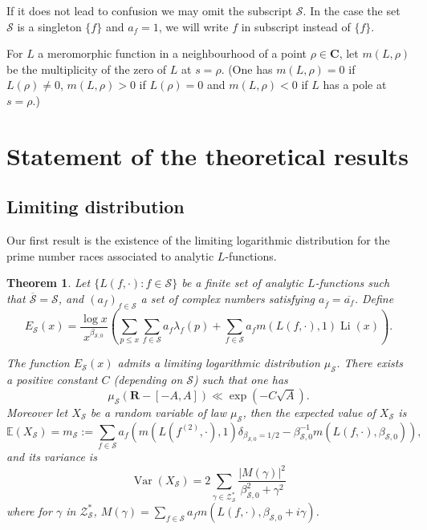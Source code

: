 \documentclass[a4paper,10pt]{amsart}
\theoremstyle{plain}
\newtheorem{theo}{Theorem}[section]
\theoremstyle{definition}
\begin{document}
If it does not lead to confusion we may omit the subscript $\mathcal{S}$. 
In the case the set $\mathcal{S}$ is a singleton $\lbrace f \rbrace$ and $a_{f}=1$, we will write $f$ in subscript instead of $\lbrace f\rbrace$.

For $L$ a meromorphic function in a neighbourhood of a point $\rho\in\mathbf{C}$,
let $m(L,\rho)$ be the multiplicity of the zero of $L$ at $s=\rho$.
(One has $m(L,\rho)=0$ if $L(\rho)\neq 0$, $m(L,\rho)>0$ if $L(\rho)= 0$ and $m(L,\rho)<0$ if $L$ has a pole at $s=\rho$.)

\section{Statement of the theoretical results}
\subsection{Limiting distribution}

Our first result is the existence of the limiting logarithmic distribution for the prime number races associated to analytic $L$-functions.
\begin{theo}\label{Th_DistLim}
Let $\lbrace L(f,\cdot) : f\in\mathcal{S} \rbrace$ be a finite set of analytic $L$-functions such that $\overline{\mathcal{S}}=\mathcal{S}$, 
and $(a_{f})_{f\in \mathcal{S}}$ a set of complex numbers satisfying $a_{\overline{f}}= \overline{a_{f}}$.
Define
$$E_{\mathcal{S}}(x)=\frac{\log x}{x^{\beta_{\mathcal{S},0}}}\left(
\sum_{p\leq x}\sum_{f\in\mathcal{S}}a_{f}\lambda_{f}(p) + \sum_{f\in\mathcal{S}}a_{f}m(L(f,\cdot),1) \operatorname{Li}(x) \right).$$

The function $E_{\mathcal{S}}(x)$ admits a limiting logarithmic distribution $\mu_{\mathcal{S}}$.
There exists a positive constant $C$ (depending on $\mathcal{S}$) such that one has 
$$\mu_{\mathcal{S}}(\mathbf{R}-[-A,A]) \ll \exp(-C\sqrt{A}).$$
Moreover let $X_{\mathcal{S}}$ be a random variable of law $\mu_{\mathcal{S}}$,
then the expected value of $X_{\mathcal{S}}$ is
	$$\mathbb{E}(X_{\mathcal{S}}) = m_{\mathcal{S}} := \sum_{f\in\mathcal{S}}a_{f}
	\left(m(L(f^{(2)},\cdot),1)\delta_{\beta_{\mathcal{S},0}=1/2} 
	-\beta_{\mathcal{S},0}^{-1}m(L(f,\cdot),\beta_{\mathcal{S},0})\right),$$ 
and its variance is
	$$\operatorname{Var}(X_{\mathcal{S}}) = 2\sum_{\gamma \in \mathcal{Z}_{\mathcal{S}}^{*}}\frac{\lvert M(\gamma)\rvert^{2}}{\beta_{\mathcal{S},0}^{2}+\gamma^{2}}$$
	where for $\gamma$ in $\mathcal{Z}_{\mathcal{S}}^{*}$, 
	$M(\gamma) = \sum_{f\in\mathcal{S}}a_{f}m(L(f,\cdot),\beta_{\mathcal{S},0}+i\gamma)$.
\end{theo}
\end{document}
